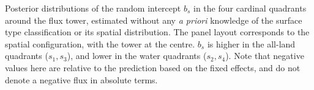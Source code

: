 \label{fig:b_Fch4_U1S04_byS_Stor} Posterior distributions of
the random intercept \(b_{s}\) in the four cardinal quadrants around the
flux tower, estimated without any \emph{a priori} knowledge of the
surface type classification or its spatial distribution. The panel
layout corresponds to the spatial configuration, with the tower at the
centre. \(b_{s}\) is higher in the all-land quadrants
(\(s_{1}, s_{3}\)), and lower in the water quadrants (\(s_{2}, s_{4}\)).
Note that negative values here are relative to the prediction based on
the fixed effects, and do not denote a negative flux in absolute terms.